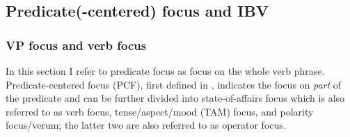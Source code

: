 \documentclass[output=paper,colorlinks,citecolor=brown,
]{langscibook}
\begin{document}
\subsection{Predicate(-centered) focus and IBV}\label{teke:sec:3.2}
\subsubsection{VP focus and verb focus}\label{teke:sec:3.2.1}
In this section I refer to predicate focus as focus on the whole verb phrase. Predicate\hyp centered focus (PCF), first defined in \citet{Güldemann2003}, indicates the focus on \textit{part} of the predicate and can be further divided into state-of-affairs focus which is also referred to as verb focus, tense/aspect/mood (TAM) focus, and polarity focus/verum; the latter two are also referred to as operator focus.
\end{document}
